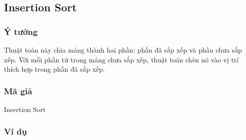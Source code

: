 \subsection{Insertion Sort}


\subsubsection{Ý tưởng}

Thuật toán này chia mảng thành hai phần: phần đã sắp xếp và 
phần chưa sắp xếp. Với mỗi phần tử trong mảng chưa sắp xếp, thuật toán chèn nó vào vị trí thích hợp trong phần đã sắp xếp. \cite[p.~90]{hoang2008}

\subsubsection{Mã giả}

\begin{algorithm}[H]
	\caption{Insertion Sort \cite[p.~19]{cormen2022} \cite{code-insertion}}
\end{algorithm}

\subsubsection{Ví dụ}

